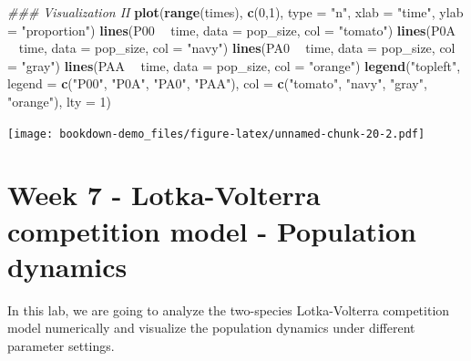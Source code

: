 \documentclass[
]{book}
\newenvironment{Shaded}{\begin{snugshade}}{\end{snugshade}}
\newcommand{\CommentTok}[1]{\textcolor[rgb]{0.56,0.35,0.01}{\textit{#1}}}
\newcommand{\DataTypeTok}[1]{\textcolor[rgb]{0.13,0.29,0.53}{#1}}
\newcommand{\DecValTok}[1]{\textcolor[rgb]{0.00,0.00,0.81}{#1}}
\newcommand{\KeywordTok}[1]{\textcolor[rgb]{0.13,0.29,0.53}{\textbf{#1}}}
\newcommand{\NormalTok}[1]{#1}
\newcommand{\OperatorTok}[1]{\textcolor[rgb]{0.81,0.36,0.00}{\textbf{#1}}}
\newcommand{\StringTok}[1]{\textcolor[rgb]{0.31,0.60,0.02}{#1}}
\begin{document}
\begin{Shaded}
\begin{Highlighting}[]
\CommentTok{### Visualization II}
\KeywordTok{plot}\NormalTok{(}\KeywordTok{range}\NormalTok{(times), }\KeywordTok{c}\NormalTok{(}\DecValTok{0}\NormalTok{,}\DecValTok{1}\NormalTok{), }\DataTypeTok{type =} \StringTok{"n"}\NormalTok{, }\DataTypeTok{xlab =} \StringTok{"time"}\NormalTok{, }\DataTypeTok{ylab =} \StringTok{"proportion"}\NormalTok{)}
\KeywordTok{lines}\NormalTok{(P00 }\OperatorTok{~}\StringTok{ }\NormalTok{time, }\DataTypeTok{data =}\NormalTok{ pop_size, }\DataTypeTok{col =} \StringTok{"tomato"}\NormalTok{)}
\KeywordTok{lines}\NormalTok{(P0A }\OperatorTok{~}\StringTok{ }\NormalTok{time, }\DataTypeTok{data =}\NormalTok{ pop_size, }\DataTypeTok{col =} \StringTok{"navy"}\NormalTok{)}
\KeywordTok{lines}\NormalTok{(PA0 }\OperatorTok{~}\StringTok{ }\NormalTok{time, }\DataTypeTok{data =}\NormalTok{ pop_size, }\DataTypeTok{col =} \StringTok{"gray"}\NormalTok{)}
\KeywordTok{lines}\NormalTok{(PAA }\OperatorTok{~}\StringTok{ }\NormalTok{time, }\DataTypeTok{data =}\NormalTok{ pop_size, }\DataTypeTok{col =} \StringTok{"orange"}\NormalTok{)}
\KeywordTok{legend}\NormalTok{(}\StringTok{"topleft"}\NormalTok{, }\DataTypeTok{legend =} \KeywordTok{c}\NormalTok{(}\StringTok{"P00"}\NormalTok{, }\StringTok{"P0A"}\NormalTok{, }\StringTok{"PA0"}\NormalTok{, }\StringTok{"PAA"}\NormalTok{), }\DataTypeTok{col =} \KeywordTok{c}\NormalTok{(}\StringTok{"tomato"}\NormalTok{, }\StringTok{"navy"}\NormalTok{, }\StringTok{"gray"}\NormalTok{, }\StringTok{"orange"}\NormalTok{), }\DataTypeTok{lty =} \DecValTok{1}\NormalTok{)}
\end{Highlighting}
\end{Shaded}

\texttt{[image: bookdown-demo\_files/figure-latex/unnamed-chunk-20-2.pdf]}

\hypertarget{week-7---lotka-volterra-competition-model---population-dynamics}{%
\chapter*{Week 7 - Lotka-Volterra competition model - Population dynamics}\label{week-7---lotka-volterra-competition-model---population-dynamics}}

In this lab, we are going to analyze the two-species Lotka-Volterra competition model numerically and visualize the population dynamics under different parameter settings.
\end{document}
